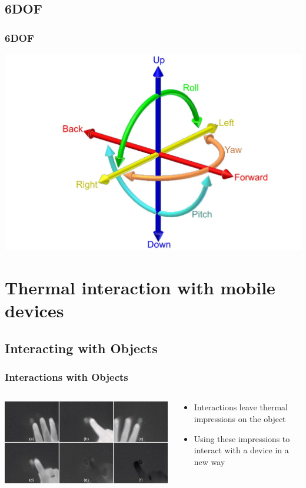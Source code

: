 \documentclass{beamer}
\begin{document}
\subsection{6DOF}
\begin{frame}
	\frametitle{6DOF}
	\includegraphics[width=\textwidth]{../Sample_paper/images/6DOF_en}
\end{frame}

\section[Mobile Thermal Interaction]{Thermal interaction with mobile devices}

\subsection{Interacting with Objects}
\begin{frame}
\frametitle{Interactions with Objects}	
	\begin{columns}
    \begin{column}{0.7\textwidth}
	\includegraphics[width=\textwidth]{images/Thermal}
	\end{column}
	\begin{column}{0.4\textwidth}
	\begin{itemize}
		\item Interactions leave thermal impressions on the object
		\item Using these impressions to interact with a device in a new way 
	\end{itemize}	
	\end{column}
    \end{columns}
\end{frame}
\end{document}
